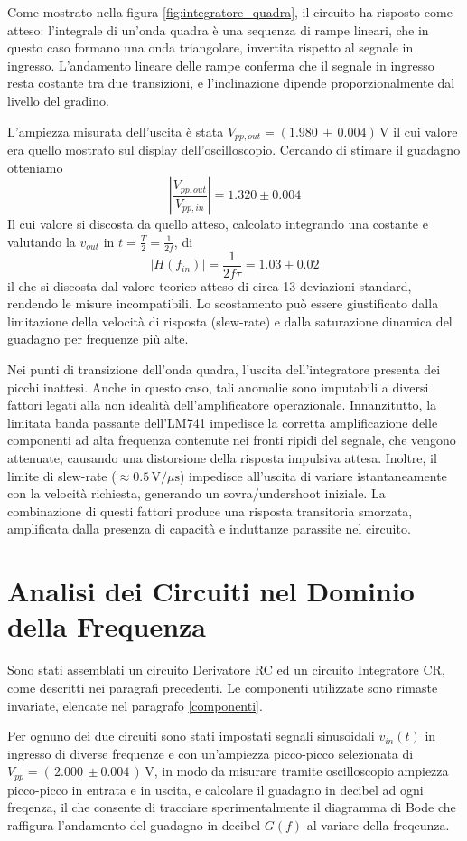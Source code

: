 \documentclass[a4paper,12pt]{article}
\begin{document}
Come mostrato nella figura \ref{fig:integratore_quadra}, il circuito ha risposto come atteso: l’integrale di un’onda quadra è una sequenza di rampe lineari, che in questo caso formano una onda triangolare, invertita rispetto al segnale in ingresso. 
L’andamento lineare delle rampe conferma che il segnale in ingresso resta costante tra due transizioni, e l’inclinazione dipende proporzionalmente dal livello del gradino.

L’ampiezza misurata dell’uscita è stata \(V_{pp,out} = (1.980\,\pm\,0.004)\,\mathrm{V}\) il cui valore era quello mostrato sul display dell'oscilloscopio. Cercando di stimare il guadagno otteniamo
\[
\left| \frac{V_{pp, out}}{V_{pp, in}} \right| = 1.320 \pm 0.004
\]
Il cui valore si discosta da quello atteso, calcolato integrando una costante e valutando la \(v_{out}\) in \(t = \frac{T}{2} =\frac{1}{2f}\), di 
\[
\left| H(f_{in}) \right| = \frac{1}{2 f \tau} = 1.03 \pm 0.02
\]
il che si discosta dal valore teorico atteso di circa 13 deviazioni standard, rendendo le misure incompatibili. Lo scostamento può essere giustificato dalla limitazione della velocità di risposta (slew-rate) e dalla saturazione dinamica del guadagno per frequenze più alte.

Nei punti di transizione dell’onda quadra, l’uscita dell’integratore presenta dei picchi inattesi. Anche in questo caso, tali anomalie sono imputabili a diversi fattori legati alla non idealità dell’amplificatore operazionale. Innanzitutto, la limitata banda passante dell’LM741 impedisce la corretta amplificazione delle componenti ad alta frequenza contenute nei fronti ripidi del segnale, che vengono attenuate, causando una distorsione della risposta impulsiva attesa. Inoltre, il limite di slew-rate (\(\approx 0.5\,\mathrm{V}/\mu\mathrm{s}\)) impedisce all’uscita di variare istantaneamente con la velocità richiesta, generando un sovra/undershoot iniziale. La combinazione di questi fattori produce una risposta transitoria smorzata, amplificata dalla presenza di capacità e induttanze parassite nel circuito.

\section{Analisi dei Circuiti nel Dominio della Frequenza}
Sono stati assemblati un circuito Derivatore RC ed un circuito Integratore CR, come descritti nei paragrafi precedenti. Le componenti utilizzate sono rimaste invariate, elencate nel paragrafo \ref{componenti}.

Per ognuno dei due circuiti sono stati impostati segnali sinusoidali $v_{in}(t)$ in ingresso di diverse frequenze e con un'ampiezza picco-picco selezionata di $V_{pp} = (\,2.000\,\pm 0.004\,) \,\mathrm{V}$, in modo da misurare tramite oscilloscopio ampiezza picco-picco in entrata e in uscita, e calcolare il guadagno in decibel ad ogni freqenza, il che consente di tracciare sperimentalmente il diagramma di Bode che raffigura l'andamento del guadagno in decibel $G(f)$ al variare della freqeunza.
\end{document}
